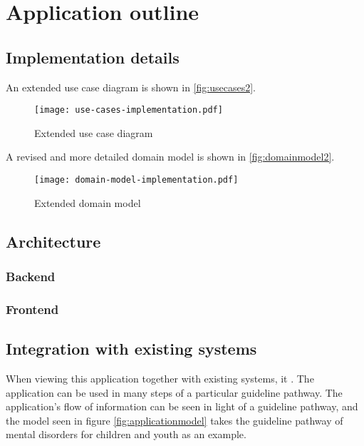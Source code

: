 \chapter{Application outline}
\label{ch:outline}

\section{Implementation details}

An extended use case diagram is shown in \autoref{fig:usecases2}.

\begin{figure}
    \centering
    \texttt{[image: use-cases-implementation.pdf]}
    \caption{Extended use case diagram}
    \label{fig:usecases2}
\end{figure}

A revised and more detailed domain model is shown in \autoref{fig:domainmodel2}.

\begin{figure}
    \centering
    \texttt{[image: domain-model-implementation.pdf]}
    \caption{Extended domain model}
    \label{fig:domainmodel2}
\end{figure}

\section{Architecture}

\subsection{Backend}

\subsection{Frontend}

\section{Integration with existing systems}

When viewing this application together with existing systems, it . The application can be used in many steps of a particular guideline pathway. The application's flow of information can be seen in light of a guideline pathway, and the model seen in figure \ref{fig:applicationmodel} takes the guideline pathway of mental disorders for children and youth \parencite{helsedirektoratet2019} as an example.


